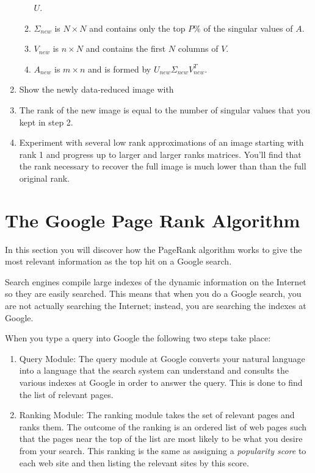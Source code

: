 \begin{problem}
\begin{enumerate}
\begin{enumerate}
                    $U$.
                \item $\Sigma_{new}$ is $N \times N$ and contains only the top $P$\% of
                    the singular values of $A$.
                \item $V_{new}$ is $n \times N$ and contains the first $N$ columns of $V$.
                \item $A_{new}$ is $m \times n$ and is formed by $U_{new} \Sigma_{new}
                    V_{new}^T$.  
            \end{enumerate}
        \item Show the newly data-reduced image with \\
        \item The rank of the new image is equal to the number of singular values that you
            kept in step 2.  
        \item Experiment with several low rank approximations of an image starting with
            rank 1 and progress up to larger and larger ranks matrices.  You'll find that
            the rank necessary to recover the full image is much lower than than the full
            original rank.
    \end{enumerate}
\end{problem}


\section{The Google Page Rank Algorithm}
In this section you will discover how the PageRank algorithm works to give the most relevant
information as the top hit on a Google search.  

Search engines compile large indexes of the dynamic information on the Internet so they
are easily searched.  This means that when you do a Google search, you are not actually
searching the Internet; instead, you are searching the indexes at Google.

When you type a query into Google the following two steps take place:
\begin{enumerate}
    \item Query Module: The query module at Google converts your natural language into a
        language that the search system can understand and consults the various indexes
        at Google in order to answer the query.  This is done to find the list of relevant
        pages.
    \item Ranking Module: The ranking module takes the set of relevant pages and ranks
        them. The outcome of the ranking is an ordered list of web pages such
        that the pages near the top of the list are most likely to be what you desire from
        your search. This ranking is the same as assigning a {\it popularity score} to
        each web site and then listing the relevant sites by this score.  
\end{enumerate}


